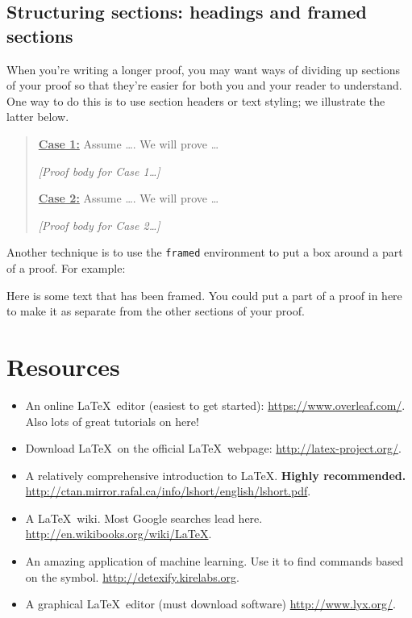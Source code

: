 \documentclass[12pt]{article}
\begin{document}
\subsection{Structuring sections: headings and framed sections}

When you're writing a longer proof, you may want ways of dividing up sections of your proof so that they're easier for both you and your reader to understand.
One way to do this is to use section headers or text styling; we illustrate the latter below.

\begin{quote}
\underline{\textbf{Case 1:}} Assume \dots. We will prove \dots

\emph{[Proof body for Case 1\dots]}

\underline{\textbf{Case 2:}} Assume \dots. We will prove \dots

\emph{[Proof body for Case 2\dots]}
\end{quote}

Another technique is to use the \texttt{framed} environment to put a box around a part of a proof.
For example:

\begin{framed}
  Here is some text that has been framed.
  You could put a part of a proof in here to make it as separate from the other sections of your proof.
\end{framed}

\section{Resources}
\begin{itemize}
\item An online \LaTeX\ editor (easiest to get started): \url{https://www.overleaf.com/}. Also lots of great tutorials on here!
\item Download \LaTeX\ on the official \LaTeX\ webpage: \url{http://latex-project.org/}.
\item A relatively comprehensive introduction to \LaTeX. \textbf{Highly recommended.} \\ \url{http://ctan.mirror.rafal.ca/info/lshort/english/lshort.pdf}.
\item A \LaTeX\ wiki. Most Google searches lead here. \url{http://en.wikibooks.org/wiki/LaTeX}.
\item An amazing application of machine learning. Use it to find commands based on the symbol. \url{http://detexify.kirelabs.org}.
\item A graphical \LaTeX\ editor (must download software) \url{http://www.lyx.org/}.
\end{itemize}


\end{document}
